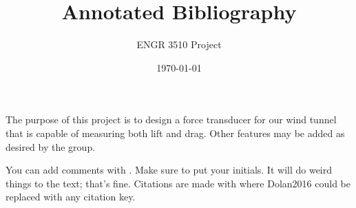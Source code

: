 \documentclass[12pt,letterpaper]{article}
\begin{document}
\title{Annotated Bibliography}
\author{ENGR 3510 Project}
\date{\today}
\maketitle


The purpose of this project is to design a force transducer for our wind tunnel that is capable of measuring both lift and drag. Other features may be added as desired by the group.

You can add comments with . Make sure to put your initials. It will do weird things to the text; that's fine. 
Citations are made with \cite{Dolan2016} where Dolan2016 could be replaced with any citation key. 

\end{document}
